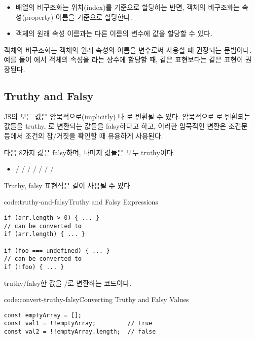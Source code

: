 \begin{itemize}
    \item 배열의 비구조화는 위치(index)를 기준으로 할당하는 반면, 객체의 비구조화는 속성(property) 이름을 기준으로 할당한다.
    \item 객체의 원래 속성 이름과는 다른 이름의 변수에 값을 할당할 수 있다.
\end{itemize}

객체의 비구조화는 객체의 원래 속성의 이름을 변수로써 사용할 때 권장되는 문법이다. 예를 들어 에서  객체의  속성을 라는 상수에 할당할 때,  같은 표현보다는  같은 표현이 권장된다.
\clearpage

\subsection*{Truthy and Falsy}

JS의 모든 값은 암묵적으로(implicitly) 나 로 변환될 수 있다. 암묵적으로 로 변환되는 값들을 truthy, 로 변환되는 값들을 falsy하다고 하고, 이러한 암묵적인 변환은 조건문 등에서 조건의 참/거짓을 확인할 때 유용하게 사용된다.

다음 8가지 값은 falsy하며, 나머지 값들은 모두 truthy이다.

\begin{itemize}
    \item {} /  /  /  /  /  /  / 
\end{itemize}

Truthy, falsy 표현식은 \와 같이 사용될 수 있다.

\begin{codeenv}{code:truthy-and-falsy}{Truthy and Falsy Expressions}\begin{verbatim}
if (arr.length > 0) { ... }
// can be converted to
if (arr.length) { ... }

if (foo === undefined) { ... }
// can be converted to
if (!foo) { ... }
\end{verbatim}
\end{codeenv}

\는 truthy/falsy한 값을 /로 변환하는 코드이다.

\begin{codeenv}{code:convert-truthy-falsy}{Converting Truthy and Falsy Values}\begin{verbatim}
const emptyArray = [];
const val1 = !!emptyArray;         // true
const val2 = !!emptyArray.length;  // false
\end{verbatim}
\end{codeenv}

